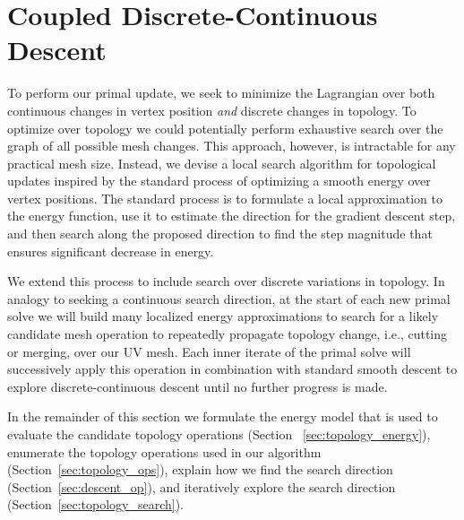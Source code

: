 
\section{Coupled Discrete-Continuous Descent}
\label{sec:topologySearch}
To perform our primal update, we seek to minimize the Lagrangian over both continuous changes in vertex position \emph{and} discrete changes in topology. 
%
To optimize over topology we could potentially perform exhaustive search over the graph of all possible mesh changes. This approach, however, is intractable for any practical mesh size. 
%
Instead, we devise a local search algorithm for topological updates inspired by the standard process of optimizing a smooth energy over vertex positions. The standard process is to formulate a local approximation to the energy function, use it to estimate the direction for the gradient descent step, and then search along the proposed direction to find the step magnitude that ensures significant decrease in energy. 
%

We extend this process to include search over discrete variations in topology. In analogy to seeking a continuous search direction, at the start of each new primal solve we will build many localized energy approximations to search for a likely candidate mesh operation to repeatedly propagate topology change, i.e., cutting or merging, over our UV mesh. Each inner iterate of the primal solve will successively apply this operation in combination with standard smooth descent to explore discrete-continuous descent until no further progress is made.%

In the remainder of this section we formulate the energy model that is used to evaluate the candidate topology operations (Section ~\ref{sec:topology_energy}), 
enumerate the topology operations used in our algorithm (Section~\ref{sec:topology_ops}), explain how we find the search direction (Section~\ref{sec:descent_op}), and iteratively explore the search direction (Section~\ref{sec:topology_search}).

